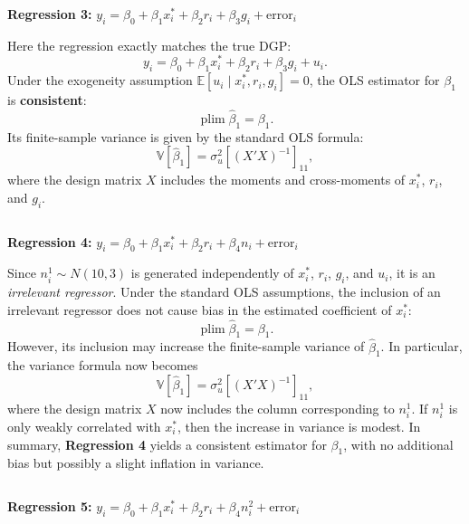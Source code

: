 \documentclass[a4paper,12pt]{article} %
\theoremstyle{nonitalic}
\newenvironment{solution}[1]
  {\renewcommand\theinnercustomsol{#1}\innercustomsol}
  {\endinnercustomsol}
\newcounter{solutionctr}
\renewcommand{\thesolutionctr}{(\alph{solutionctr})}
\newenvironment{autosolution}
  {\stepcounter{solutionctr}\begin{solution}{\thesolutionctr}}
  {\end{solution}}
\begin{document}
\begin{autosolution}
\begin{lstlisting}[language=R]

\end{lstlisting}

\textbf{Regression 3:} $y_i = \beta_0 + \beta_1 x^*_i + \beta_2 r_i + \beta_3 g_i + \text{error}_i$

Here the regression exactly matches the true DGP:
\[
y_i=\beta_0+\beta_1x_i^*+\beta_2r_i+\beta_3g_i+u_i.
\]
Under the exogeneity assumption $\mathbb{E}[u_i\mid x_i^*,r_i,g_i]=0$, the OLS estimator for $\beta_1$ is \textbf{consistent}:
\[
\operatorname*{plim}\hat{\beta}_1=\beta_1.
\]
Its finite-sample variance is given by the standard OLS formula:
\[
\mathbb{V}[\hat{\beta}_1]=\sigma_u^2\left[(X'X)^{-1}\right]_{11},
\]
where the design matrix $X$ includes the moments and cross-moments of $x_i^*$, $r_i$, and $g_i$.

\begin{lstlisting}[language=R]

\end{lstlisting}

\textbf{Regression 4:} $y_i = \beta_0 + \beta_1 x^*_i + \beta_2 r_i + \beta_4 n_i + \text{error}_i$

Since $n_i^1\sim N(10,3)$ is generated independently of $x_i^*$, $r_i$, $g_i$, and $u_i$, 
it is an \emph{irrelevant regressor}. 
Under the standard OLS assumptions, 
the inclusion of an irrelevant regressor does not 
cause bias in the estimated coefficient of $x_i^*$:
\[
\operatorname*{plim}\hat{\beta}_1 = \beta_1.
\]
However, its inclusion may increase the finite-sample variance of $\hat{\beta}_1$. 
In particular, the variance formula now becomes
\[
\mathbb{V}[\hat{\beta}_1] = \sigma_u^2\left[(X'X)^{-1}\right]_{11},
\]
where the design matrix $X$ now includes the column corresponding to $n_i^1$. 
If $n_i^1$ is only weakly correlated with $x_i^*$, 
then the increase in variance is modest. 
In summary, \textbf{Regression 4} yields a consistent estimator for $\beta_1$, with no additional bias but possibly a slight inflation in variance.


\begin{lstlisting}[language=R]

\end{lstlisting}

\textbf{Regression 5:} $y_i = \beta_0 + \beta_1 x^*_i + \beta_2 r_i + \beta_4 n_i^2 + \text{error}_i$


\end{autosolution}
\end{document}
